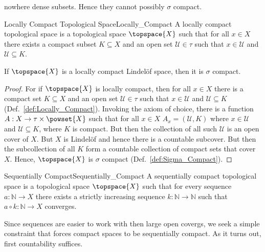         nowhere dense subsets. Hence they cannot possibly $\sigma$ compact.
        \begin{fdefinition}{Locally Compact Topological Space}{Locally_Compact}
            A locally compact topological space is a topological space
            $\topspace{X}$ such that for all $x\in{X}$ there exists a compact
            subset $K\subseteq{X}$ and an open set $\mathcal{U}\in\tau$ such
            that $x\in\mathcal{U}$ and $\mathcal{U}\subseteq{K}$.
        \end{fdefinition}
        \begin{theorem}
            \label{thm:Loc_Comp_and_Lindelof_Implies_Sigma_Comp}%
            If $\topspace{X}$ is a locally compact Lindel\"{o}f space, then it
            is $\sigma$ compact.
        \end{theorem}
        \begin{proof}
            For if $\topspace{X}$ is locally compact, then for all $x\in{X}$
            there is a compact set $K\subseteq{X}$ and an open set
            $\mathcal{U}\in\tau$ such that $x\in\mathcal{U}$ and
            $\mathcal{U}\subseteq{K}$ (Def.~\ref{def:Locally_Compact}).
            Invoking the axiom of choice, there is a function
            $A:X\rightarrow\tau\times\powset{X}$ such that for all $x\in{X}$
            $A_{x}=(\mathcal{U},K)$ where $x\in\mathcal{U}$ and
            $\mathcal{U}\subseteq{K}$, where $K$ is compact. But then the
            collection of all such $\mathcal{U}$ is an open cover of $X$. But
            $X$ is Lindel\"{o}f and hence there is a countable subcover. But
            then the subcollection of all $K$ form a countable collection of
            compact sets that cover $X$. Hence, $\topspace{X}$ is $\sigma$
            compact (Def.~\ref{def:Sigma_Compact}).
        \end{proof}
        \begin{fdefinition}{Sequentially Compact}{Sequentially_Compact}
            A sequentially compact topological space is a topological space
            $\topspace{X}$ such that for every sequence
            $a:\mathbb{N}\rightarrow{X}$ there exists a strictly increasing
            sequence $k:\mathbb{N}\rightarrow\mathbb{N}$ such that
            $a\circ{k}:\mathbb{N}\rightarrow{X}$ converges.
        \end{fdefinition}
        Since sequences are easier to work with then large open covergs, we
        seek a simple constraint that forces compact spaces to be
        sequentially compact. As it turns out, first countability suffices.
